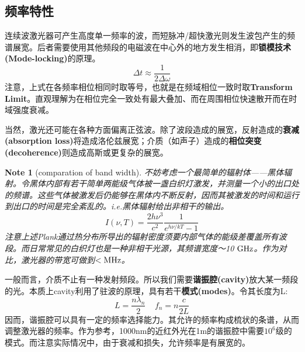 \documentclass[12pt]{ctexart}%
\newtheorem{note}{Note}
\begin{document}
\subsection*{频率特性}
\par 连续波激光器可产生高度单一频率的波，而短脉冲/超快激光则发生波包产生的频谱展宽。后者需要使用其他频段的电磁波在中心外的地方发生相消，即\textbf{锁模技术(Mode-locking)}的原理。
\begin{equation}
    \Delta t \approx \frac{1}{2 \Delta \omega}
\end{equation}
注意，上式在各频率相位相同时取等号，也就是在频域相位一致时取\textbf{Transform Limit}。直观理解为在相位完全一致处有最大叠加、而在周围相位快速散开而在时域强度衰减。
\par 当然，激光还可能在各种方面偏离正弦波。除了波段造成的展宽，反射造成的\textbf{衰减(absorption loss)}将造成洛伦兹展宽；介质（如声子）造成的\textbf{相位突变(decoherence)}则造成高斯或更复杂的展宽。
\begin{note}[comparation of band width]
    \par 不妨考虑一个最简单的辐射体——黑体辐射。令黑体内部有若干简单两能级气体被一盏白织灯激发，并测量一个小的出口处的频谱。这些气体被激发后仍能够在黑体内不断反射，因而其被激发的时间和运行到出口的时间是完全紊乱的。i.e.黑体辐射给出非相干的输出。
    \begin{equation}
        I(\nu, T)=\frac{2h\nu^3}{c^2}\frac{1}{e^{h\nu/kT}-1}
    \end{equation}
注意上述Plank通过热分布所导出的辐射密度须要内部气体的能级差覆盖所有波段。而日常常见的白织灯也是一种非相干光源，其频谱宽度～10 $\textup{GHz}$。作为对比，激光器的带宽可做到$<\textup{MHz}$。
\end{note}
\par 一般而言，介质不止有一种发射频段。所以我们需要\textbf{谐振腔(cavity)}放大某一频段的光。本质上cavity利用了驻波的原理，具有若干\textbf{模式(modes)}。令其长度为L:
\begin{equation}
    L = \frac{n \lambda_n}{2} \ \ \ \ \
    f_n = n \frac{c}{2L}
\end{equation}
因而，谐振腔可以具有一定的频率选择能力。其允许的频率构成梳状的条谱，从而调整激光器的频率。作为参考，1000nm的近红外光在1m的谐振腔中需要$10^6$级的模式。而注意实际情况中，由于衰减和损失，允许频率是有展宽的。
\end{document}
